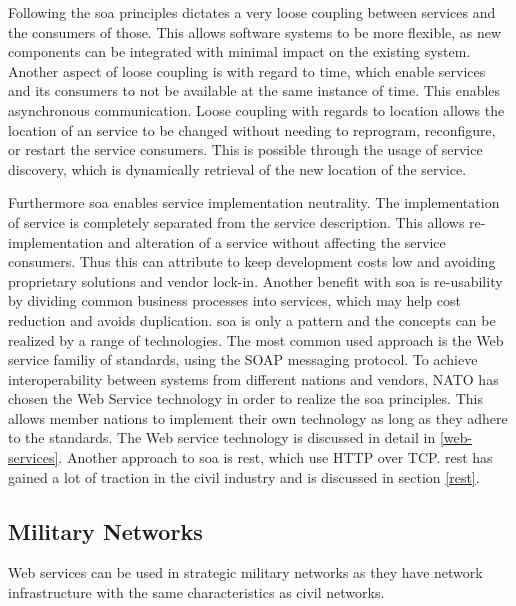 \documentclass[USenglish]{ifimaster}
\begin{document}
Following the \gls{soa} principles dictates a very loose coupling between
services and the consumers of those. This allows software systems to be more
flexible, as new components can be integrated with minimal impact on the
existing system. Another aspect of loose coupling is with regard to time, which
enable services and its consumers to not be available at the same instance of
time. This enables asynchronous communication. Loose coupling with regards to
location allows the location of an service to be changed without needing to
reprogram, reconfigure, or restart the service consumers. This is possible
through the usage of service discovery, which is dynamically retrieval of the
new location of the service.

 Furthermore \gls{soa} enables service implementation neutrality. The
implementation of service is completely separated from the service description.
This allows re-implementation and alteration of a service without affecting the
service consumers. Thus this can attribute to keep development costs low and
avoiding proprietary solutions and vendor lock-in. Another benefit with
\gls{soa} is re-usability by dividing common business processes into services,
which may help cost reduction and avoids duplication. \gls{soa} is only a
pattern and the concepts can be realized by a range of technologies. The most
common used approach is the Web service familiy of standards, using the SOAP
messaging protocol. To achieve interoperability between systems from different
nations and vendors, NATO has chosen the Web Service technology in order to
realize the \gls{soa}  principles. This allows member nations to implement
their own technology as long as they adhere to the standards. The Web service
technology is discussed in detail in \cref{web-services}. Another approach to
\gls{soa} is \gls{rest}, which use HTTP over TCP. \gls{rest} has gained a lot
of traction in the civil industry and is discussed in section \cref{rest}.

\subsection{Military Networks}
Web services can be used in strategic military networks as they have network
infrastructure with the same characteristics as civil networks.
\end{document}
